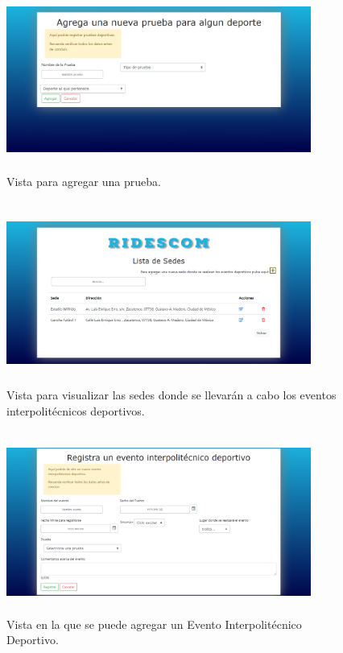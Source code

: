 		\begin{figure}
			\centering
			\includegraphics[width=10cm, height=6cm]{Imagenes/Vistas/Vista20_AgregaPrueba}
			\caption{Vista para agregar una prueba.}
			\label{VistaAgregaPrueba}
		\end{figure}
		
	
		\begin{figure} [hbt!]
			\centering
			\includegraphics[width=10cm, height=6cm]{Imagenes/Vistas/Vista9_SedesJFD}
			\caption{Vista para visualizar las sedes donde se llevarán a cabo los eventos interpolitécnicos deportivos.}
			\label{VistaSedes}
		\end{figure}
		
		\begin{figure} [hbt!]
			\centering
			\includegraphics[width=10cm, height=6cm]{Imagenes/Vistas/Vista10_AgregaEvento}
			\caption{Vista en la que se puede agregar un Evento Interpolitécnico Deportivo.}
			\label{VistaAgregarEvento}
		\end{figure}
	
